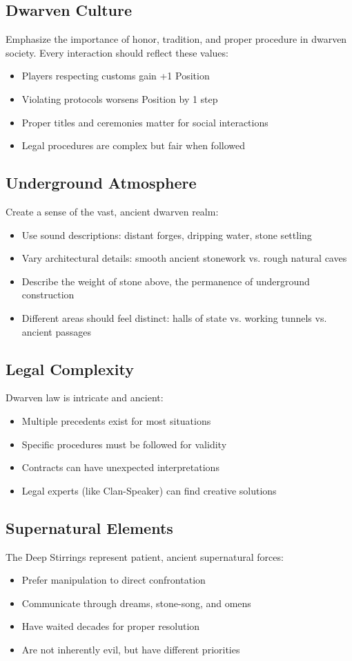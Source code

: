 \documentclass[11pt]{article}
\begin{document}
\subsection{Dwarven Culture}
Emphasize the importance of honor, tradition, and proper procedure in dwarven society. Every interaction should reflect these values:
\begin{itemize}
\item Players respecting customs gain +1 Position
\item Violating protocols worsens Position by 1 step
\item Proper titles and ceremonies matter for social interactions
\item Legal procedures are complex but fair when followed
\end{itemize}

\subsection{Underground Atmosphere}
Create a sense of the vast, ancient dwarven realm:
\begin{itemize}
\item Use sound descriptions: distant forges, dripping water, stone settling
\item Vary architectural details: smooth ancient stonework vs. rough natural caves
\item Describe the weight of stone above, the permanence of underground construction
\item Different areas should feel distinct: halls of state vs. working tunnels vs. ancient passages
\end{itemize}

\subsection{Legal Complexity}
Dwarven law is intricate and ancient:
\begin{itemize}
\item Multiple precedents exist for most situations
\item Specific procedures must be followed for validity
\item Contracts can have unexpected interpretations
\item Legal experts (like Clan-Speaker) can find creative solutions
\end{itemize}

\subsection{Supernatural Elements}
The Deep Stirrings represent patient, ancient supernatural forces:
\begin{itemize}
\item Prefer manipulation to direct confrontation
\item Communicate through dreams, stone-song, and omens
\item Have waited decades for proper resolution
\item Are not inherently evil, but have different priorities
\end{itemize}
\end{document}
